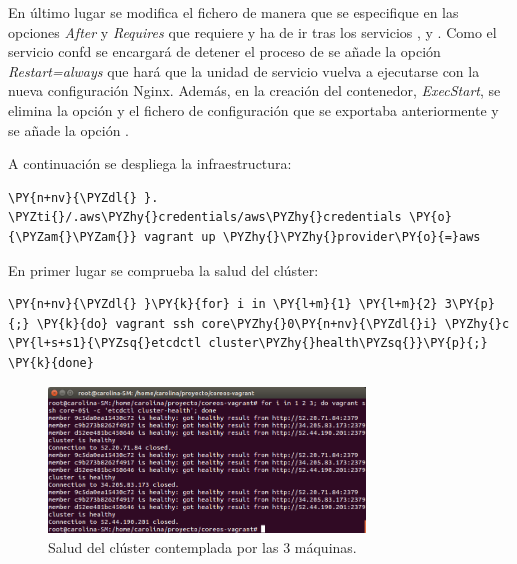 En último lugar se modifica el fichero  de manera que se especifique en las opciones \textit{After} y \textit{Requires} que requiere y ha de ir tras los servicios ,  y . Como el servicio confd se encargará de detener el proceso de  se añade la opción \textit{Restart=always} que hará que la unidad de servicio vuelva a ejecutarse con la nueva configuración Nginx. Además, en la creación del contenedor, \textit{ExecStart}, se elimina la opción  y el fichero de configuración que se exportaba anteriormente  y se añade la opción .

A continuación se despliega la infraestructura:

\begin{framed_shaded}
\begin{Verbatim}[fontsize=\relsize{-2.5},fontseries=b,commandchars=\\\{\}]
\PY{n+nv}{\PYZdl{} }. \PYZti{}/.aws\PYZhy{}credentials/aws\PYZhy{}credentials \PY{o}{\PYZam{}\PYZam{}} vagrant up \PYZhy{}\PYZhy{}provider\PY{o}{=}aws
\end{Verbatim}
\end{framed_shaded}

En primer lugar se comprueba la salud del clúster:

\begin{framed_shaded}
\begin{Verbatim}[fontsize=\relsize{-2.5},fontseries=b,commandchars=\\\{\}]
\PY{n+nv}{\PYZdl{} }\PY{k}{for} i in \PY{l+m}{1} \PY{l+m}{2} 3\PY{p}{;} \PY{k}{do} vagrant ssh core\PYZhy{}0\PY{n+nv}{\PYZdl{}i} \PYZhy{}c \PY{l+s+s1}{\PYZsq{}etcdctl cluster\PYZhy{}health\PYZsq{}}\PY{p}{;} \PY{k}{done}
\end{Verbatim}
\end{framed_shaded}

\begin{figure}[H]
\centering
\includegraphics[width=0.75\textwidth]{images/figures/health-confd.png}
\caption{Salud del clúster contemplada por las 3 máquinas.}
\end{figure}

